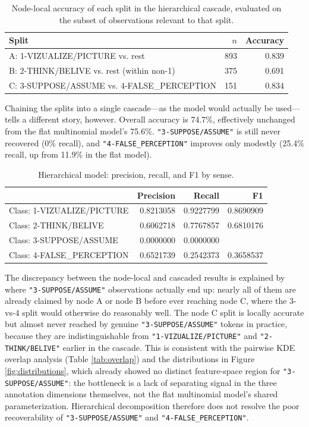 \documentclass[
]{article}
\begin{document}
\begin{table}[H]
\centering
\caption{\label{tab:unnamed-chunk-14}Node-local accuracy of each split in the hierarchical cascade, evaluated on the subset of observations relevant to that split.\label{tab:nodeAccuracy}}
\centering
\begin{tabular}[t]{lrr}
\toprule
Split & $n$ & Accuracy\\
\midrule
A: 1-VIZUALIZE/PICTURE vs. rest & 893 & 0.839\\
B: 2-THINK/BELIVE vs. rest (within non-1) & 375 & 0.691\\
C: 3-SUPPOSE/ASSUME vs. 4-FALSE\_PERCEPTION & 151 & 0.834\\
\bottomrule
\end{tabular}
\end{table}

Chaining the splits into a single cascade---as the model would actually
be used---tells a different story, however. Overall accuracy is 74.7\%,
effectively unchanged from the flat multinomial model's 75.6\%.
\texttt{"3-SUPPOSE/ASSUME"} is still never recovered (0\% recall), and
\texttt{"4-FALSE\_PERCEPTION"} improves only modestly (25.4\% recall, up
from 11.9\% in the flat model).

\begin{table}[H]
\centering
\caption{\label{tab:unnamed-chunk-15}Hierarchical model: precision, recall, and F1 by sense.\label{tab:hierAccuracy}}
\centering
\begin{tabular}[t]{lrrr}
\toprule
  & Precision & Recall & F1\\
\midrule
Class: 1-VIZUALIZE/PICTURE & 0.8213058 & 0.9227799 & 0.8690909\\
Class: 2-THINK/BELIVE & 0.6062718 & 0.7767857 & 0.6810176\\
Class: 3-SUPPOSE/ASSUME & 0.0000000 & 0.0000000 & \\
Class: 4-FALSE\_PERCEPTION & 0.6521739 & 0.2542373 & 0.3658537\\
\bottomrule
\end{tabular}
\end{table}

The discrepancy between the node-local and cascaded results is explained
by where \texttt{"3-SUPPOSE/ASSUME"} observations actually end up:
nearly all of them are already claimed by node A or node B before ever
reaching node C, where the 3-vs-4 split would otherwise do reasonably
well. The node C split is locally accurate but almost never reached by
genuine \texttt{"3-SUPPOSE/ASSUME"} tokens in practice, because they are
indistinguishable from \texttt{"1-VIZUALIZE/PICTURE"} and
\texttt{"2-THINK/BELIVE"} earlier in the cascade. This is consistent
with the pairwise KDE overlap analysis (Table \ref{tab:overlap}) and the
distributions in Figure \ref{fig:distributions}, which already showed no
distinct feature-space region for \texttt{"3-SUPPOSE/ASSUME"}: the
bottleneck is a lack of separating signal in the three annotation
dimensions themselves, not the flat multinomial model's shared
parameterization. Hierarchical decomposition therefore does not resolve
the poor recoverability of \texttt{"3-SUPPOSE/ASSUME"} and
\texttt{"4-FALSE\_PERCEPTION"}.
\end{document}
